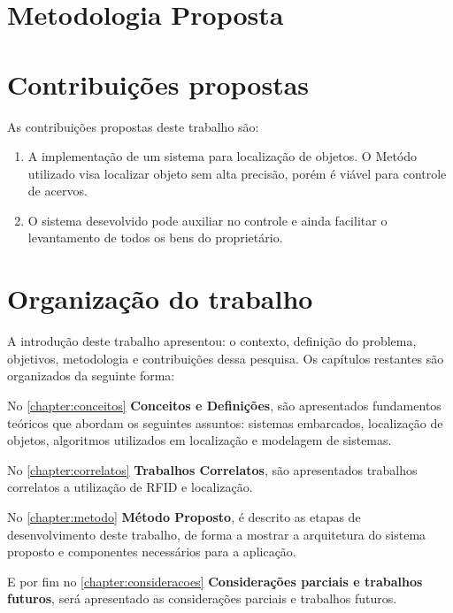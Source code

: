 \section{Metodologia Proposta}

\section{Contribuições propostas}
As contribuições propostas deste trabalho são:
\begin{enumerate}
    \item A implementação de um sistema para localização de objetos. O Metódo utilizado visa localizar objeto sem alta precisão, porém é viável para controle de acervos.
    \item O sistema desevolvido pode auxiliar no controle e ainda facilitar o levantamento de todos os bens do proprietário.
\end{enumerate}


\section{Organização do trabalho}
A introdução deste trabalho apresentou: o contexto, definição do problema, objetivos, metodologia e contribuições dessa pesquisa. Os capítulos restantes são organizados da seguinte forma:

\par
No \autoref{chapter:conceitos} \textbf{Conceitos e Definições}, são apresentados fundamentos teóricos que abordam os seguintes assuntos: sistemas embarcados, localização de objetos, algoritmos utilizados em localização e modelagem de sistemas.

\par
No \autoref{chapter:correlatos} \textbf{Trabalhos Correlatos}, são apresentados trabalhos correlatos a utilização de RFID e localização.

\par
No \autoref{chapter:metodo} \textbf{Método Proposto}, é descrito as etapas de desenvolvimento deste trabalho, de forma a mostrar a arquitetura do sistema proposto e componentes necessários para a aplicação.

\par
\par
E por fim no \autoref{chapter:consideracoes} \textbf{Considerações parciais e trabalhos futuros}, será apresentado as considerações parciais e trabalhos futuros.

